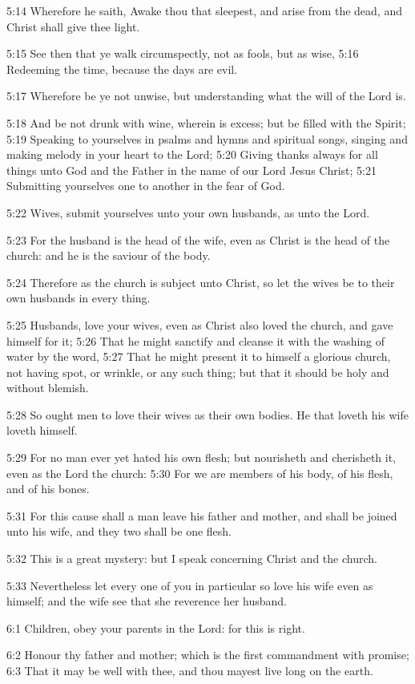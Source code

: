 5:14 Wherefore he saith, Awake thou that sleepest, and arise from the dead, and Christ shall give thee light.

5:15 See then that ye walk circumspectly, not as fools, but as wise, 5:16 Redeeming the time, because the days are evil.

5:17 Wherefore be ye not unwise, but understanding what the will of the Lord is.

5:18 And be not drunk with wine, wherein is excess; but be filled with the Spirit; 5:19 Speaking to yourselves in psalms and hymns and spiritual songs, singing and making melody in your heart to the Lord; 5:20 Giving thanks always for all things unto God and the Father in the name of our Lord Jesus Christ; 5:21 Submitting yourselves one to another in the fear of God.

5:22 Wives, submit yourselves unto your own husbands, as unto the Lord.

5:23 For the husband is the head of the wife, even as Christ is the head of the church: and he is the saviour of the body.

5:24 Therefore as the church is subject unto Christ, so let the wives be to their own husbands in every thing.

5:25 Husbands, love your wives, even as Christ also loved the church, and gave himself for it; 5:26 That he might sanctify and cleanse it with the washing of water by the word, 5:27 That he might present it to himself a glorious church, not having spot, or wrinkle, or any such thing; but that it should be holy and without blemish.

5:28 So ought men to love their wives as their own bodies. He that loveth his wife loveth himself.

5:29 For no man ever yet hated his own flesh; but nourisheth and cherisheth it, even as the Lord the church: 5:30 For we are members of his body, of his flesh, and of his bones.

5:31 For this cause shall a man leave his father and mother, and shall be joined unto his wife, and they two shall be one flesh.

5:32 This is a great mystery: but I speak concerning Christ and the church.

5:33 Nevertheless let every one of you in particular so love his wife even as himself; and the wife see that she reverence her husband.

6:1 Children, obey your parents in the Lord: for this is right.

6:2 Honour thy father and mother; which is the first commandment with promise; 6:3 That it may be well with thee, and thou mayest live long on the earth.

